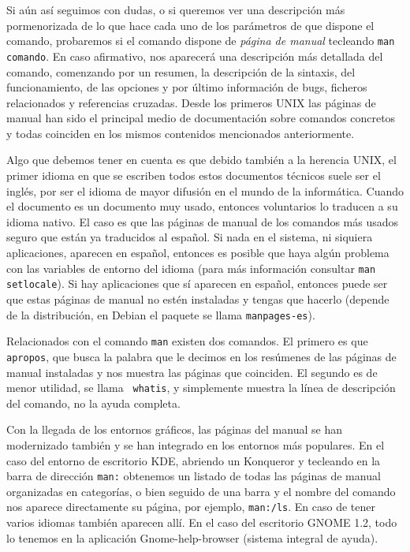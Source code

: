 Si aún así  seguimos con dudas, o si queremos  ver una descripción más
pormenorizada de lo que hace cada uno de los parámetros de que dispone
el comando, probaremos si el comando dispone de {\em página de manual}
tecleando {\tt  man comando}.  En caso  afirmativo, nos  aparecerá una
descripción más detallada  del comando, comenzando por  un resumen, la
descripción de la sintaxis, del  funcionamiento, de las opciones y por
último  información  de  bugs,  ficheros  relacionados  y  referencias
cruzadas. Desde  los primeros UNIX las  páginas de manual han  sido el
principal  medio de  documentación  sobre comandos  concretos y  todas
coinciden en los mismos contenidos mencionados anteriormente.

Algo que debemos  tener en cuenta es que debido  también a la herencia
UNIX,  el primer  idioma en  que  se escriben  todos estos  documentos
técnicos suele ser  el inglés, por ser el idioma  de mayor difusión en
el mundo  de la informática. Cuando  el documento es un  documento muy
usado, entonces voluntarios lo traducen a su idioma nativo. El caso es
que las páginas de manual de  los comandos más usados seguro que están
ya  traducidos  al  español.  Si  nada  en  el  sistema,  ni  siquiera
aplicaciones, aparecen en español, entonces  es posible que haya algún
problema con las variables de entorno del idioma (para más información
consultar {\tt man setlocale}). Si hay aplicaciones que sí aparecen en
español,  entonces puede  ser que  estas  páginas de  manual no  estén
instaladas y tengas que hacerlo (depende de la distribución, en Debian
el paquete se llama {\tt manpages-es}).

Relacionados con el comando {\tt man} existen dos comandos. El primero
es  que {\tt  apropos}, que  busca la  palabra que  le decimos  en los
resúmenes  de las  páginas  de  manual instaladas  y  nos muestra  las
páginas que coinciden. El segundo es  de menor utilidad, se llama {\tt
whatis}, y simplemente muestra la línea de descripción del comando, no
la ayuda completa.

Con la llegada de los entornos gráficos, las páginas del manual se han
modernizado también y se han  integrado en los entornos más populares.
En  el caso  del entorno  de escritorio  {\sf KDE},  abriendo un  {\sf
Konqueror} y tecleando  en la barra de dirección  {\tt man:} obtenemos
un listado de todas las páginas de manual organizadas en categorías, o
bien  seguido  de una  barra  y  el  nombre  del comando  nos  aparece
directamente su página,  por ejemplo, {\tt man:/ls}. En  caso de tener
varios idiomas también  aparecen allí. En el caso  del escritorio {\sf
GNOME 1.2}, todo lo tenemos  en la aplicación {\sf Gnome-help-browser}
(sistema integral de ayuda).

